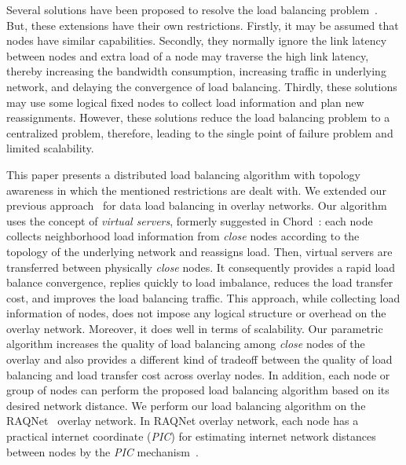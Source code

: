 \documentclass {article}
\begin{document}
Several solutions have been proposed to resolve the load balancing problem~\cite{chord,disloadbalancing,loadbalancesp,proximity-Awareload,loadbalancedsp,CFS,ResourceSharing,kargarLoadbalancing}. But, these extensions have their own restrictions. Firstly, it may be assumed that nodes have similar capabilities. Secondly,  they normally ignore the link latency between nodes and extra load of a node may traverse the high link latency, thereby increasing the bandwidth consumption, increasing traffic in underlying network, and delaying the convergence of load balancing. Thirdly, these solutions may use some logical fixed nodes to collect load information and plan new reassignments. However, these solutions reduce the load balancing problem to a centralized problem, therefore, leading to the single point of failure problem and limited scalability.

This paper presents a distributed load balancing algorithm with topology awareness in which the mentioned restrictions are dealt with.
 We extended our previous approach~\cite{LoadBalancingRAQNet} for data load balancing in overlay networks.
Our algorithm  uses the concept of \emph {virtual servers}, formerly suggested in Chord~\cite{chord}: each node collects neighborhood load information from  \emph{close}  nodes according to the topology of the
underlying network  and reassigns  load. Then, virtual servers are transferred between physically  \emph{close} nodes.
It consequently  provides a rapid load balance convergence, replies quickly  to load imbalance,
reduces the load transfer cost, and improves the load balancing traffic.
This approach, while collecting load  information of nodes, does not impose any logical structure or overhead on the overlay network.
Moreover, it  does well in terms of scalability.
Our parametric algorithm  increases the quality of load balancing among   \emph{close} nodes of the overlay and also  provides a different kind of tradeoff between  the quality of load balancing and load transfer cost across overlay nodes.
In addition, each node or group of nodes can perform the proposed load balancing algorithm based on its
desired network distance. We perform our load balancing algorithm on the RAQNet~\cite{RAQNet} overlay network. In RAQNet overlay network, each node has a practical internet coordinate  (\emph{PIC})   for estimating internet network distances  between nodes by the \emph{PIC} mechanism~\cite{PIC}.
\end{document}
